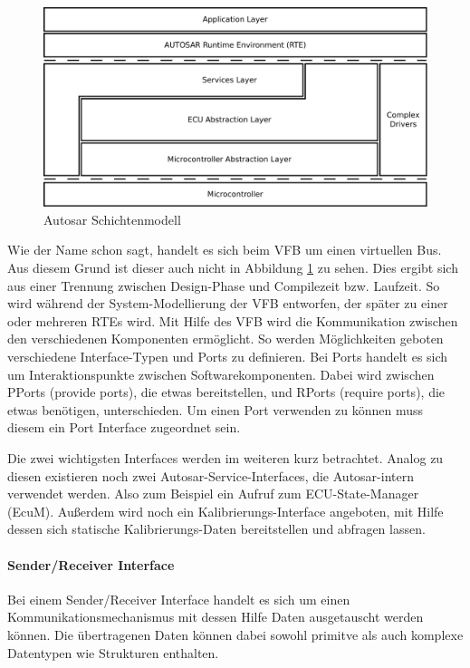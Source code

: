 \documentclass[
  a4paper,					    %
  twoside,
  DIV=calc,     				%
  bibliography=totoc,
  cleardoublepage=empty,
  ngerman,     					%
  final       					%
]{scrbook}
\begin{document}
\begin{figure}[h]
    \centering
    \includegraphics[width=1\textwidth]{autosar_layer.png}
    \caption{Autosar Schichtenmodell}
    \label{fig:autosar_layer}
\end{figure}

Wie der Name schon sagt, handelt es sich beim VFB um einen virtuellen Bus. Aus diesem Grund ist dieser auch nicht in Abbildung \ref{fig:autosar_layer} zu sehen. Dies ergibt sich aus einer Trennung zwischen Design-Phase und Compilezeit bzw. Laufzeit. So wird während der System-Modellierung der VFB entworfen, der später zu einer oder mehreren RTEs wird. Mit Hilfe des VFB wird die Kommunikation zwischen den verschiedenen Komponenten ermöglicht. So werden Möglichkeiten geboten verschiedene Interface-Typen und Ports zu definieren. Bei Ports handelt es sich um Interaktionspunkte zwischen Softwarekomponenten. Dabei wird zwischen PPorts (provide ports), die etwas bereitstellen, und RPorts (require ports), die etwas benötigen, unterschieden. Um einen Port verwenden zu können muss diesem ein Port Interface zugeordnet sein.

Die zwei wichtigsten Interfaces werden im weiteren kurz betrachtet. Analog zu diesen existieren noch zwei Autosar-Service-Interfaces, die Autosar-intern verwendet werden. Also zum Beispiel ein Aufruf zum ECU-State-Manager (EcuM). Außerdem wird noch ein Kalibrierungs-Interface angeboten, mit Hilfe dessen sich statische Kalibrierungs-Daten bereitstellen und abfragen lassen.

\paragraph{Sender/Receiver Interface}
Bei einem Sender/Receiver Interface handelt es sich um einen Kommunikationsmechanismus mit dessen Hilfe Daten ausgetauscht werden können. Die übertragenen Daten können dabei sowohl primitve als auch komplexe Datentypen wie Strukturen enthalten.
\end{document}
